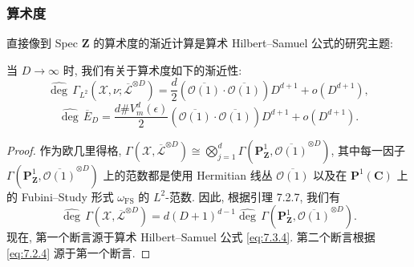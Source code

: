 \subsubsection{算术度}\label{sec:8.2.4}

直接像到 Spec \(\mathbf{Z}\) 的算术度的渐近计算是算术 Hilbert--Samuel 公式的研究主题:

\begin{lemma}\label{lem:8.2.5}
当 \(D \to \infty\) 时, 我们有关于算术度如下的渐近性:
\begin{equation}\label{eq:8.2.6}
\widehat{\operatorname{deg}} \, \Gamma_{L^{2}} \left( \mathcal{X}, \nu; \overline{\mathcal{L}}^{\otimes D} \right) = \frac{d}{2} \left( \overline{\mathcal{O}(1)} \cdot \overline{\mathcal{O}(1)} \right) D^{d+1} + o(D^{d+1}),
\end{equation}
\[ \widehat{\operatorname{deg}} \, \overline{E}_{D} = \frac{d \# V_{m}^{d}(\epsilon)}{2} \left( \overline{\mathcal{O}(1)} \cdot \overline{\mathcal{O}(1)} \right) D^{d+1} + o(D^{d+1}). \]
\end{lemma}

\begin{proof}
作为欧几里得格, \(\Gamma(\mathcal{X}, \overline{\mathcal{L}}^{\otimes D}) \cong \bigotimes_{j=1}^{d} \Gamma\left(\mathbf{P}_{\mathbf{Z}}^{1}, \overline{\mathcal{O}(1)}^{\otimes D}\right)\), 
其中每一因子 \(\Gamma\left(\mathbf{P}_{\mathbf{Z}}^{1}, \overline{\mathcal{O}(1)}^{\otimes D}\right)\) 上的范数都是使用 Hermitian 线丛 \(\overline{\mathcal{O}(1)}\) 
以及在 \(\mathbf{P}^1(\mathbf{C})\) 上的 Fubini--Study 形式 \(\omega_{\text{FS}}\) 的 \(L^2\)-范数. 
因此, 根据引理 7.2.7, 我们有
\[ \widehat{\operatorname{deg}}\,\Gamma\left(\mathcal{X},\overline{\mathcal{L}}^{\otimes D}\right) = d(D+1)^{d-1}\widehat{\operatorname{deg}}\,\Gamma\left(\mathbf{P}_{\mathbf{Z}}^{1},\overline{\mathcal{O}(1)}^{\otimes D}\right). \]
现在, 第一个断言源于算术 Hilbert--Samuel 公式 \eqref{eq:7.3.4}. 
第二个断言根据 \eqref{eq:7.2.4} 源于第一个断言.
\end{proof}

